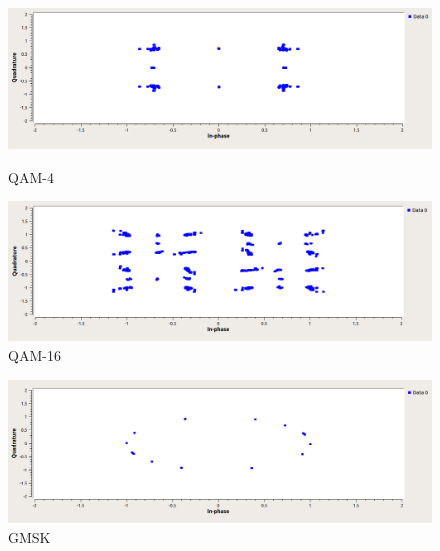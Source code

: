 \begin{figure}[!htb]
	\includegraphics[width=\linewidth]{pics/QAM-4}
	\caption{QAM-4}\label{fig:QAM-4}
	\endminipage\hfill
	\includegraphics[width=\linewidth]{pics/QAM-16}
	\caption{QAM-16}\label{fig:QAM-16}
	\endminipage\hfill
\end{figure}

\begin{figure}[H]
	\begin{center}
		\includegraphics[width=\linewidth]{pics/GMSK}
		\caption{GMSK}
		\label{fig:GMSK}
	\end{center}
\end{figure}


